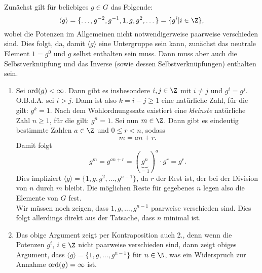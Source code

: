 \begin{beweis}
Zunächst gilt für beliebiges $g \in G$ das Folgende:
\begin{equation}
\langle g \rangle = \{ \dots,g^{-2},g^{-1},1, g, g^2, \dots \} = \{g^i | i \in \Z\},
\end{equation}
wobei die Potenzen im Allgemeinen nicht notwendigerweise paarweise verschieden sind.
Dies folgt, da, damit $\langle g \rangle$ eine Untergruppe sein kann, zunächst das neutrale Element $1 = g^0$ und $g$ selbst enthalten sein muss. Dann muss aber auch die Selbstverknüpfung und das Inverse (sowie dessen Selbstverknüpfungen) enthalten sein.
\begin{enumerate}
\item Sei $\operatorname{\text{ord}} (g) < \infty$. Dann gibt es insbesondere $i,j \in \Z$ mit $i \neq j$ und $g^i = g^j$. O.B.d.A. sei $i > j$. Dann ist also $k = i-j \geq 1$ eine natürliche Zahl, für die gilt: $g^k = 1$. Nach dem Wohlordnungssatz existiert eine \textit{kleinste} natürliche Zahl $n \geq 1$, für die gilt: $g^n =1$. Sei nun $m \in \Z$. Dann gibt es eindeutig bestimmte Zahlen $a \in \Z$ und $0 \leq r < n$, sodass \begin{equation}
m = an +r.
\end{equation}
Damit folgt
\begin{equation}
g^m = g^{an+r} = (\underbrace{g^n}_{=1})^a \cdot g^r = g^r.
\end{equation}
Dies impliziert $\langle g \rangle = \{1,g,g^2,\dots, g^{n-1}\}$, da $r$ der Rest ist, der bei der Division von $n$ durch $m$ bleibt. Die möglichen Reste für gegebenes $n$ legen also die Elemente von $G$ fest.\\
Wir müssen noch zeigen, dass $1, g, \dots, g^{n-1}$ paarweise verschieden sind. Dies folgt allerdings direkt aus der Tatsache, dass $n$ minimal ist.
\item Das obige Argument zeigt per Kontraposition auch 2., denn wenn die Potenzen $g^i$, $i \in \Z$ nicht paarweise verschieden sind, dann zeigt obiges Argument, dass $\langle g \rangle = \{1,g,\dots, g^{n-1}\}$ für $n \in \N$, was ein Widerspruch zur Annahme $\operatorname{\text{ord}} (g) = \infty$ ist.
\end{enumerate}
\end{beweis}
